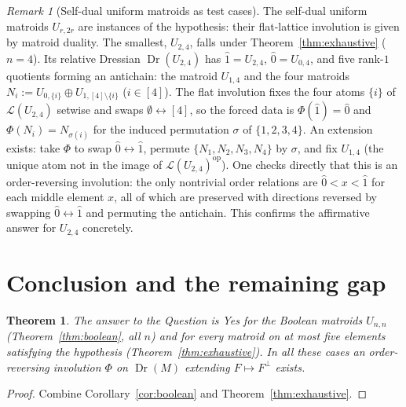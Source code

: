 \documentclass[11pt]{article}
\newcommand{\Dr}{\operatorname{Dr}}
\newcommand{\op}{\mathrm{op}}
\newcommand{\cL}{\mathcal{L}}
\newtheorem{theorem}{Theorem}
\theoremstyle{definition}
\theoremstyle{remark}
\newtheorem{remark}{Remark}
\begin{document}
\begin{remark}[Self-dual uniform matroids as test cases]\label{rem:uniform}
The self-dual uniform matroids $U_{r,2r}$ are instances of the hypothesis: their
flat-lattice involution is given by matroid duality. The smallest, $U_{2,4}$, falls
under Theorem~\ref{thm:exhaustive} ($n=4$). Its relative Dressian
$\Dr(U_{2,4})$ has $\hat 1=U_{2,4}$, $\hat 0=U_{0,4}$, and five rank-$1$ quotients
forming an antichain: the matroid $U_{1,4}$ and the four matroids
$N_i:=U_{0,\{i\}}\oplus U_{1,[4]\setminus\{i\}}$ ($i\in[4]$). The flat involution
fixes the four atoms $\{i\}$ of $\cL(U_{2,4})$ setwise and swaps $\emptyset\leftrightarrow[4]$,
so the forced data is $\Phi(\hat 1)=\hat 0$ and $\Phi(N_i)=N_{\sigma(i)}$ for the
induced permutation $\sigma$ of $\{1,2,3,4\}$. An extension exists: take $\Phi$ to
swap $\hat 0\leftrightarrow\hat 1$, permute $\{N_1,N_2,N_3,N_4\}$ by $\sigma$, and fix
$U_{1,4}$ (the unique atom not in the image of $\cL(U_{2,4})^{\op}$). One checks
directly that this is an order-reversing involution: the only nontrivial order
relations are $\hat 0<x<\hat 1$ for each middle element $x$, all of which are
preserved with directions reversed by swapping $\hat 0\leftrightarrow\hat 1$ and
permuting the antichain. This confirms the affirmative answer for $U_{2,4}$
concretely.
\end{remark}

\section{Conclusion and the remaining gap}\label{sec:gap}

\begin{theorem}\label{thm:final}
The answer to the Question is \emph{Yes} for the Boolean matroids $U_{n,n}$
(Theorem~\ref{thm:boolean}, all $n$) and for every matroid on at most five elements
satisfying the hypothesis (Theorem~\ref{thm:exhaustive}). In all these cases an
order-reversing involution $\Phi$ on $\Dr(M)$ extending $F\mapsto F^{\perp}$ exists.
\end{theorem}

\begin{proof}
Combine Corollary~\ref{cor:boolean} and Theorem~\ref{thm:exhaustive}.
\end{proof}
\end{document}
